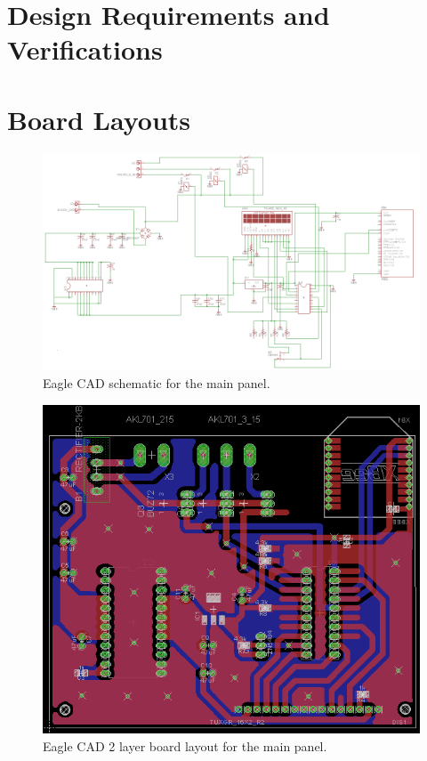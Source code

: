 \appendix
\pagebreak
\section{Design Requirements and Verifications}
\label{reqtab}



\section{Board Layouts}

\begin{figure}[htb]
\centering
\includegraphics[width=.99\textwidth]{mainboard_schematic.png}
\caption{Eagle CAD schematic for the main panel.}
\label{fig:mainboard_schematic}
\end{figure}

\begin{figure}[htb]
\centering
\includegraphics[width=.99\textwidth]{mainboard_layout.png}
\caption{Eagle CAD 2 layer board layout for the main panel.}
\label{fig:mainboard_layout}
\end{figure}

